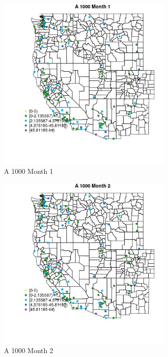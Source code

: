 \begin{figure} 
\centering  
\includegraphics[width=0.77\textwidth]{Code_Outputs/Report_ML_input_PM25_Step4_part_e_de_duplicated_aves_MapObsMo1A_1000.jpg} 
\caption{\label{fig:Report_ML_input_PM25_Step4_part_e_de_duplicated_avesMapObsMo1A_1000}A 1000 Month 1} 
\end{figure} 
 

\begin{figure} 
\centering  
\includegraphics[width=0.77\textwidth]{Code_Outputs/Report_ML_input_PM25_Step4_part_e_de_duplicated_aves_MapObsMo2A_1000.jpg} 
\caption{\label{fig:Report_ML_input_PM25_Step4_part_e_de_duplicated_avesMapObsMo2A_1000}A 1000 Month 2} 
\end{figure} 
 

